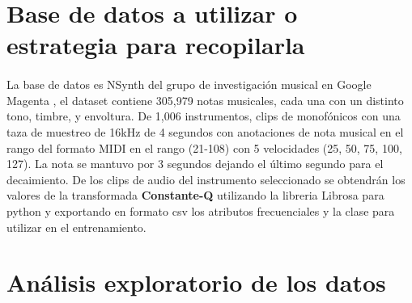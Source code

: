 \documentclass[12pt]{article}
\begin{document}
	\section{Base de datos a utilizar o estrategia para recopilarla}
	\paragraph{} La base de datos es NSynth del grupo de investigación musical en Google Magenta \cite{engel_neural_2017}, el dataset contiene 305,979 notas musicales, cada una con un distinto tono, timbre, y envoltura. De 1,006 instrumentos, clips de monofónicos con una taza de muestreo de 16kHz de 4 segundos con anotaciones de nota musical en el rango del formato MIDI en el rango (21-108) con 5 velocidades (25, 50, 75, 100, 127). La nota se mantuvo por 3 segundos dejando el último segundo para el decaimiento.
	De los clips de audio del instrumento seleccionado se obtendrán los valores de la transformada \textbf{Constante-Q} utilizando la libreria Librosa para python \cite{mcfee_librosa_2015} y exportando en formato csv los atributos frecuenciales y la clase para utilizar en el entrenamiento.
	\section{Análisis exploratorio de los datos}
	
\end{document}
